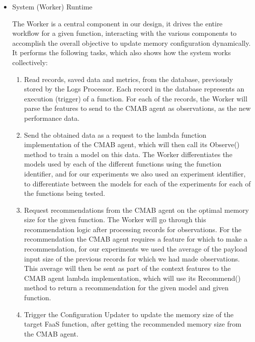 \documentclass[conference]{IEEEtran}
\begin{document}
\begin{itemize}
\item System (Worker) Runtime

The Worker is a central component in our design, it drives the entire workflow for a given function, interacting with the various components to accomplish the overall objective to update memory configuration dynamically. It performs the following tasks, which also shows how the system works collectively:

\begin{enumerate}
    \item Read records, saved data and metrics, from the database, previously stored by the Logs Processor. Each record in the database represents an execution (trigger) of a function. For each of the records, the Worker will parse the features to send to the CMAB agent as observations, as the new performance data.
    \item Send the obtained data as a request to the lambda function implementation of the CMAB agent, which will then call its Observe() method to train a model on this data. The Worker differentiates the models used by each of the different functions using the function identifier, and for our experiments we also used an experiment identifier, to differentiate between the models for each of the experiments for each of the functions being tested.
    \item Request recommendations from the CMAB agent on the optimal memory size for the given function. The Worker will go through this recommendation logic after processing records for observations. For the recommendation the CMAB agent requires a feature for which to make a recommendation, for our experiments we used the average of the payload input size of the previous records for which we had made observations. This average will then be sent as part of the context features to the CMAB agent lambda implementation, which will use its Recommend() method to return a recommendation for the given model and given function.
    \item Trigger the Configuration Updater to update the memory size of the target FaaS function, after getting the recommended memory size from the CMAB agent.
\end{enumerate}

\end{itemize}
\end{document}
